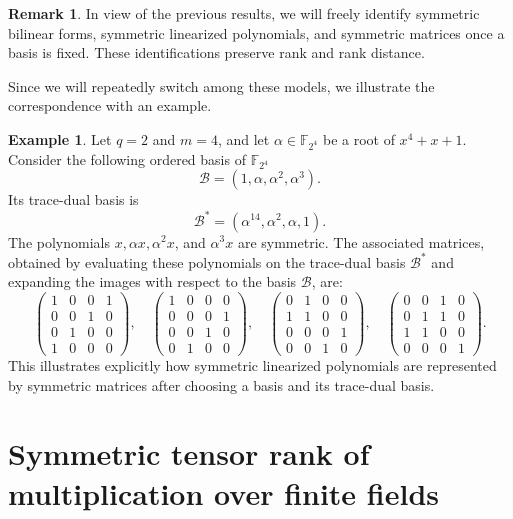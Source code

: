 \documentclass[11pt,a4paper,reqno]{article}
\numberwithin{equation}{section}
\theoremstyle{definition}
\newtheorem{example}[theorem]{Example}
\newtheorem{remark}[theorem]{Remark}
\newcommand{\numberset}{\mathbb}
\newcommand{\F}{\numberset{F}}
\begin{document}
\begin{remark}
    In view of the previous results, we will freely identify symmetric bilinear forms, symmetric linearized polynomials, and symmetric matrices once a basis is fixed. These identifications preserve rank and rank distance.
\end{remark}

Since we will repeatedly switch among these models, we illustrate the correspondence with an example.

\begin{example}
Let \(q=2\) and \(m=4\), and let \(\alpha\in \mathbb F_{2^4}\) be a root of \(x^4+x+1\). Consider the following ordered basis of $\F_{2^4}$
\[ \mathcal{B}=(1,\alpha,\alpha^2,\alpha^3). \]
Its trace-dual basis is 
\[ \mathcal{B}^*=(\alpha^{14},\alpha^2,\alpha,1). \]
The polynomials \(x,\alpha x,\alpha^2x\), and \(\alpha^3x\) are symmetric. The associated matrices, obtained by evaluating these polynomials on the trace-dual basis \(\mathcal{B}^*\) and expanding the images with respect to the basis \(\mathcal{B}\), are:
\[
\begin{pmatrix}
1 & 0 & 0 & 1 \\
0 & 0 & 1 & 0 \\
0 & 1 & 0 & 0 \\
1 & 0 & 0 & 0
\end{pmatrix},\quad
\begin{pmatrix}
1 & 0 & 0 & 0 \\
0 & 0 & 0 & 1 \\
0 & 0 & 1 & 0 \\
0 & 1 & 0 & 0
\end{pmatrix},\quad
\begin{pmatrix}
0 & 1 & 0 & 0 \\
1 & 1 & 0 & 0 \\
0 & 0 & 0 & 1 \\
0 & 0 & 1 & 0
\end{pmatrix},\quad
\begin{pmatrix}
0 & 0 & 1 & 0 \\
0 & 1 & 1 & 0 \\
1 & 1 & 0 & 0 \\
0 & 0 & 0 & 1
\end{pmatrix}.
\]
This illustrates explicitly how symmetric linearized polynomials are represented by symmetric matrices after choosing a basis and its trace-dual basis.
\end{example}

\section{Symmetric tensor rank of multiplication over finite fields}\label{sec:2}
\end{document}
